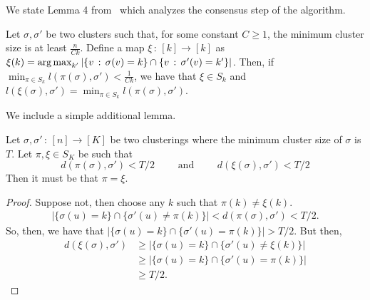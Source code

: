 \documentclass{article}
\begin{document}
We state Lemma 4 from~\cite{gao2015achieving} which analyzes the consensus step of the algorithm.
\begin{lemma} 
\label{lem:consensus_analysis}
Let $\sigma, \sigma'$ be two clusters such that, for some constant $C \geq 1$, the minimum cluster size is at least $ \frac{n}{Ck}$. Define a map $\xi \,:\, [k] \rightarrow [k]$ as $\xi(k) = \mathop{\text{\rm arg\,max}}_{k'} | \{ v \,:\, \sigma(v) = k \} \cap \{ v \,:\, \sigma'(v) = k' \} |$. Then, if $\min_{\pi \in S_k} l(\pi(\sigma), \sigma') < \frac{1}{Ck}$, we have that $\xi \in S_k$ and $l(\xi(\sigma), \sigma') = \min_{\pi \in S_k} l(\pi(\sigma), \sigma')$. 
\end{lemma}

We include a simple additional lemma.
\begin{lemma}
\label{lem:consensus_uniqueness}
Let $\sigma, \sigma' \,:\, [n] \rightarrow [K]$ be two clusterings where the minimum cluster size of $\sigma$ is $T$. Let $\pi, \xi \in S_K$ be such that
\[
d(\pi(\sigma), \sigma') < T/2 \qquad \text{ and }  \qquad d(\xi(\sigma), \sigma') < T/2
\]
Then it must be that $\pi = \xi$.
\end{lemma}

\begin{proof}
Suppose not, then choose any $k$ such that $\pi(k) \neq \xi(k)$. 
\begin{align*}
| \{ \sigma(u) = k \} \cap \{ \sigma'(u) \neq \pi(k) \} | < d(\pi(\sigma), \sigma') < T/2.
\end{align*}
So, then, we have that $| \{ \sigma(u) = k \} \cap \{ \sigma'(u) = \pi(k) \}| > T/2$. But then,
\begin{align*}
d(\xi(\sigma), \sigma') &\geq | \{ \sigma(u) = k \} \cap \{\sigma'(u) \neq \xi(k) \} | \\
   &\geq | \{ \sigma(u) = k\} \cap \{ \sigma'(u) = \pi(k) \}| \\ 
   &\geq T/2.
\end{align*}
\end{proof}

\end{document}
